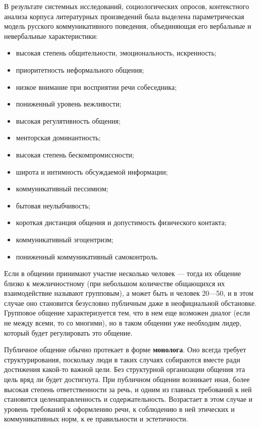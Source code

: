  В результате системных исследований, социологических опросов, контекстного анализа
 корпуса литературных произведений была выделена параметрическая модель русского коммуникативного поведения, объединяющая его вербальные и невербальные характеристики:
 \begin{itemize} 
    \item высокая степень общительности, эмоциональность, искренность;
    \item приоритетность неформального общения;
    \item низкое внимание при восприятии речи собеседника;
    \item пониженный уровень вежливости;
    \item высокая регулятивность общения;
    \item менторская доминантность;
    \item высокая степень бескомпромиссности;
    \item широта и интимность обсуждаемой информации;
    \item коммуникативный пессимизм;
    \item бытовая неулыбчивость;
    \item короткая дистанция общения и допустимость физического контакта;
    \item коммуникативный эгоцентризм;
    \item пониженный коммуникативный самоконтроль.
\end{itemize}

Если в общении принимают участие несколько человек — тогда их общение близко к межличностному (при небольшом количестве общающихся их взаимодействие называют групповым), а может быть и человек 20—50, и в этом случае оно становится безусловно публичным даже в неофициальной обстановке. Групповое общение характеризуется тем, что в нем еще возможен диалог (если не между всеми, то со многими), но в таком общении уже необходим лидер, который будет регулировать это общение.

 Публичное общение обычно протекает в форме \textbf{монолога}. Оно всегда требует структурирования, поскольку люди в таких случаях собираются вместе ради достижения какой-то важной цели. Без структурной организации общения эта цель вряд ли будет достигнута. При публичном общении возникает иная, более высокая степень ответственности за речь, и одним из главных требований к ней становится целенаправленность и содержательность. Возрастает в этом случае и уровень требований к оформлению речи, к соблюдению в ней этических и коммуникативных норм, к ее правильности и эстетичности.

